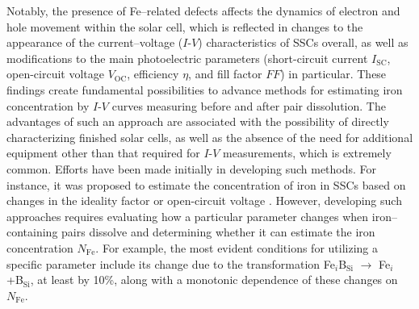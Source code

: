 \documentclass[a4paper,fleqn]{cas-sc}
\begin{document}
Notably, the presence of Fe--related defects affects the dynamics of electron and hole movement within the solar cell,
which is reflected in changes to the appearance of the current--voltage ($I$-$V$) characteristics of SSCs overall,
as well as modifications to the main photoelectric parameters
(short-circuit current  $I_\mathrm{SC}$,
open-circuit voltage $V_\mathrm{OC}$,
efficiency $\eta$, and fill factor $FF$)
in particular.
These findings create fundamental possibilities to advance methods for estimating iron concentration by $I$-$V$ curves measuring before and after pair dissolution.
The advantages of such an approach are associated with the possibility of directly characterizing finished solar cells,
as well as the absence of the need for additional equipment other than that required for $I$-$V$ measurements, which is extremely common.
Efforts have been made initially in developing such methods.
For instance, it was proposed to estimate the concentration of iron in SSCs based on changes in the ideality factor \cite{Olikh2019SM,Olikh2022PPV}
or open-circuit voltage \cite{Herguth2022}.
However, developing such approaches requires evaluating how a particular parameter changes when iron--containing pairs dissolve
and determining whether it can estimate the iron concentration $N_\mathrm{Fe}$.
For example, the most evident conditions for utilizing a specific parameter include its change due to the transformation
Fe$_i$B$_\mathrm{Si}$ $\rightarrow$ Fe$_i$ +B$_\mathrm{Si}$,
at least by 10\%, along with a monotonic dependence of these changes on $N_\mathrm{Fe}$.
\end{document}
